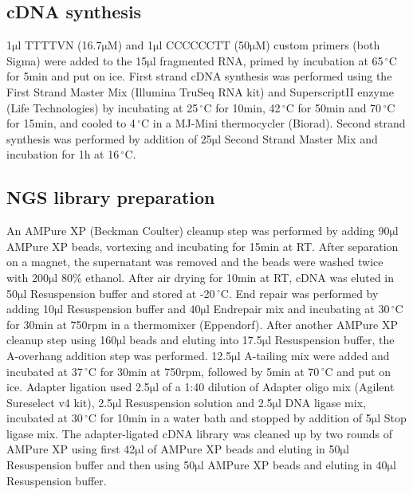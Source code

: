 \documentclass[10pt]{article}
\newcommand{\mul}{\ensuremath{\mathrm{\mu l}}}
\newcommand{\C}{\,$^{\circ}\mathrm{C}$}
\begin{document}
\subsection*{cDNA synthesis}

1{\mul} TTTTVN (16.7$\mathrm{\mu M}$) and 1{\mul} CCCCCCTT (50$\mathrm{\mu M}$) custom primers (both Sigma) were added to the 15{\mul} fragmented RNA, primed by incubation at 65{\C} for 5min and put on ice. First strand cDNA synthesis was performed using the First Strand Master Mix (Illumina TruSeq RNA kit) and SuperscriptII enzyme (Life Technologies) by incubating at 25{\C} for 10min, 42{\C} for 50min and 70{\C} for 15min, and cooled to 4{\C} in a MJ-Mini thermocycler (Biorad). Second strand synthesis was performed by addition of 25{\mul} Second Strand Master Mix and incubation for 1h at 16{\C}.

\subsection*{NGS library preparation}

An AMPure XP (Beckman Coulter) cleanup step was performed by adding 90{\mul} AMPure XP beads, vortexing and incubating for 15min at RT. After separation on a magnet, the supernatant was removed and the beads were washed twice with 200{\mul} 80\% ethanol. After air drying for 10min at RT, cDNA was eluted in 50{\mul} Resuspension buffer and stored at -20{\C}.
End repair was performed by adding 10{\mul} Resuspension buffer and 40{\mul} Endrepair mix and incubating at 30{\C} for 30min at 750rpm in a thermomixer (Eppendorf).
After another AMPure XP cleanup step using 160{\mul} beads and eluting into 17.5{\mul} Resuspension buffer, the A-overhang addition step was performed. 12.5{\mul} A-tailing mix were added and incubated at 37{\C} for 30min at 750rpm, followed by 5min at 70{\C} and put on ice. Adapter ligation used 2.5{\mul} of a 1:40 dilution of Adapter oligo mix (Agilent Sureselect v4 kit), 2.5{\mul} Resuspension solution and 2.5{\mul} DNA ligase mix, incubated at 30{\C} for 10min in a water bath and stopped by addition of 5{\mul} Stop ligase mix. The adapter-ligated cDNA library was cleaned up by two rounds of AMPure XP using first 42{\mul} of AMPure XP beads and eluting in 50{\mul} Resuspension buffer and then using 50{\mul} AMPure XP beads and eluting in 40{\mul} Resuspension buffer.
\end{document}

